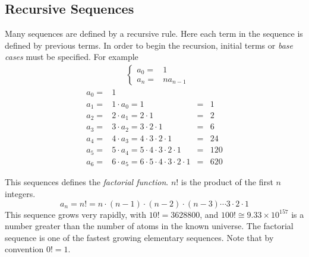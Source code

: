 \documentclass[12pt]{article}
\begin{document}
\subsection*{Recursive Sequences}

Many sequences are defined by a recursive rule. Here each term in the sequence is defined by previous terms. In order to begin the recursion, initial terms or \emph{base cases} must be specified. For example
\begin{align*}
  &\begin{cases}
    a_0=&1\\
    a_n=&n a_{n-1}
  \end{cases}
\end{align*}
\begin{align*}
  a_0=&1   & &\\
  a_1=&1 \cdot a_0 = 1 &=&1  \\
  a_2=&2 \cdot a_1 = 2 \cdot 1 &=&2  \\
  a_3=&3 \cdot a_2 = 3 \cdot 2 \cdot 1 &=&6  \\
  a_4=&4 \cdot a_3 = 4 \cdot 3 \cdot 2 \cdot 1 &=&24  \\
  a_5=&5 \cdot a_4 = 5 \cdot 4 \cdot 3 \cdot 2 \cdot 1 &=&120  \\
  a_6=&6 \cdot a_5 = 6 \cdot 5 \cdot 4 \cdot 3 \cdot 2 \cdot 1 &=&620
\end{align*}

This sequences defines the \emph{factorial function}. $n!$ is the product of the first $n$ integers.
\[ a_n = n! = n \cdot (n-1) \cdot \left( n-2 \right) \cdot \left( n-3 \right) \cdots 3 \cdot 2 \cdot 1 \]
This sequence grows very rapidly, with $10!=3628800$, and $100! \cong 9.33 \times 10 ^{157}$ is a number greater than the number of atoms in the known universe. The factorial sequence is one of the fastest growing elementary sequences. Note that by convention $0!=1$.
\end{document}
